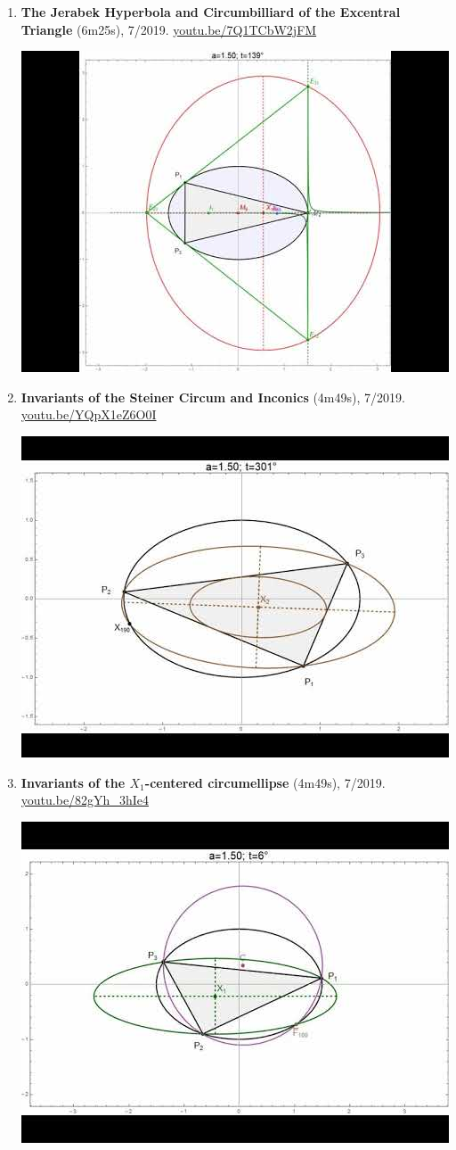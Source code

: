 \documentclass[12pt]{article}
\begin{document}
\begin{enumerate}[resume]
% 
\item \textbf{The Jerabek Hyperbola and Circumbilliard of the Excentral Triangle} (6m25s), 7/2019. \href{https://youtu.be/7Q1TCbW2jFM}{\url{youtu.be/7Q1TCbW2jFM}}
\begin{center}\includegraphics[width=.5\textwidth]{pics/7Q1TCbW2jFM.jpg}\end{center}
% 
\item \textbf{Invariants of the Steiner Circum and Inconics} (4m49s), 7/2019. \href{https://youtu.be/YQpX1eZ6O0I}{\url{youtu.be/YQpX1eZ6O0I}}
\begin{center}\includegraphics[width=.5\textwidth]{pics/YQpX1eZ6O0I.jpg}\end{center}
% 
\item \textbf{Invariants of the $X_{1}$-centered circumellipse} (4m49s), 7/2019. \href{https://youtu.be/82gYh_3hIe4}{\url{youtu.be/82gYh\_3hIe4}}
\begin{center}\includegraphics[width=.5\textwidth]{pics/82gYh_3hIe4.jpg}\end{center}

\end{enumerate}
\end{document}
